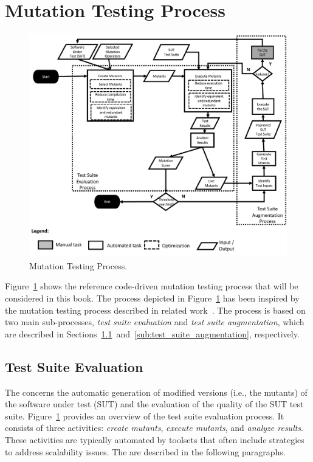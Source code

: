 
\section{Mutation Testing Process}
\label{sec:process}

	\begin{figure}
	\centering
		\includegraphics[width=\textwidth]{images/process}
		\caption{Mutation Testing Process.}
		\label{fig:code:process}
	\end{figure}

Figure~\ref{fig:code:process} shows the reference code-driven mutation testing process that will be considered in this book. The process depicted in Figure~\ref{fig:code:process} has been inspired by the mutation testing process described in related work~\cite{offutt2001mutation,papadakis2019mutation}. The process is based on two main sub-processes, \emph{test suite evaluation} and \emph{test suite augmentation}, which are described in Sections~\ref{sub:test_suite_evaluation}~and~\ref{sub:test_suite_augmentation}, respectively.


\subsection{Test Suite Evaluation} %
\label{sub:test_suite_evaluation}

The  concerns the automatic generation of modified versions (i.e., the mutants) of the software under test (SUT) and the evaluation of the quality of the SUT test suite. 
Figure~\ref{fig:code:process} provides an overview of the test suite evaluation process.
It consists of three activities: \emph{create mutants}, \emph{execute mutants}, and \emph{analyze results}.  
These activities are typically automated by toolsets that often include strategies to address scalability issues. The are described in the following paragraphs.



